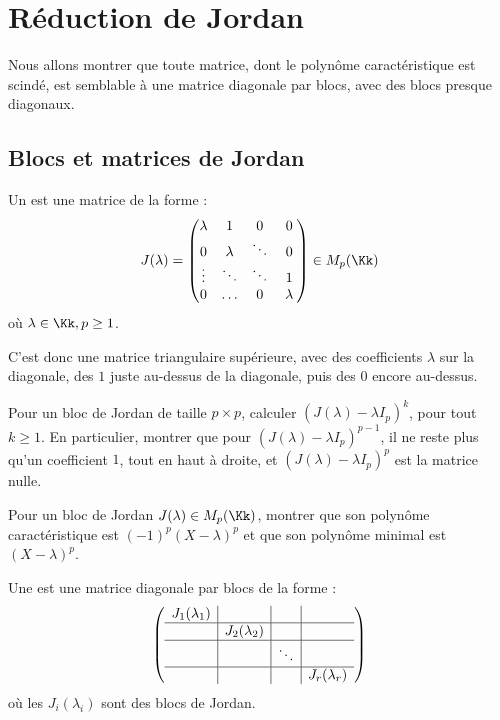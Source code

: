 \documentclass[12pt, class=report,crop=false]{standalone}
\begin{document}
\section{Réduction de Jordan}


Nous allons montrer que toute matrice, dont le polynôme caractéristique est scindé, est semblable à une matrice diagonale par blocs, avec des blocs \og{}presque\fg{} diagonaux.


\subsection{Blocs et matrices de Jordan}


\begin{definition}
Un  est une matrice de la forme :
\[J(\lambda) = 
\begin{pmatrix}
\lambda&1&0&\hphantom{\;}0\hphantom{\;}\\
0&\lambda&\ddots&0\\
\vdots&\ddots&\ddots&1\\
0&\ldots&0&\lambda
\end{pmatrix}
\in M_p(\Kk)\]
où $\lambda \in \Kk, p \ge 1$.
\end{definition}

C'est donc une matrice triangulaire supérieure, avec des coefficients $\lambda$ sur la diagonale, des $1$ juste au-dessus de la diagonale, puis des $0$ encore au-dessus.


\begin{exercicecours}
Pour un bloc de Jordan de taille $p\times p$, calculer $(J(\lambda)-\lambda I_p)^k$, pour tout $k\ge 1$.
En particulier, montrer que pour 
$(J(\lambda)-\lambda I_p)^{p-1}$, il ne reste plus qu'un coefficient $1$, tout en haut à droite, 
et $(J(\lambda)-\lambda I_p)^{p}$ est la matrice nulle.
\end{exercicecours}


\begin{exercicecours}
Pour un bloc de Jordan $J(\lambda) \in M_p(\Kk)$,
montrer que son polynôme caractéristique 
est $(-1)^p(X-\lambda)^p$ et que son polynôme minimal 
est $(X-\lambda)^p$.
\end{exercicecours}


\begin{definition}
Une  est une matrice diagonale par blocs de la forme :
\[\left(\begin{array}{c|c|c|c}
J_1(\lambda_1)&&&\\\hline
&J_2(\lambda_2)&&\\\hline
&&\ddots&\\\hline
&&&J_r(\lambda_r)
\end{array}\right)\]
où les $J_i(\lambda_i)$ sont des blocs de Jordan.
\end{definition}
\end{document}
